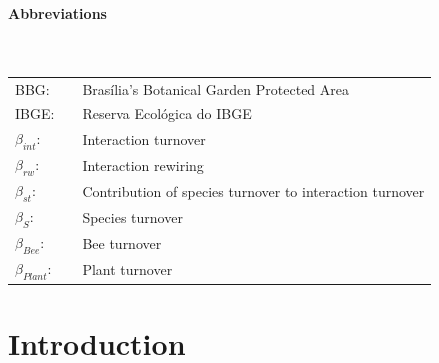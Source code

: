 \documentclass[11pt]{article}
\begin{document}
\newpage
{}
\vspace*{\fill}
\tableofcontents 
\vspace*{\fill} 
\thispagestyle{empty}

\doublespacing

\newpage 
\vspace*{\fill}
{\huge\bfseries Abbreviations} \\
\\
\\
\begin{table}[h]
\centering
\large
{}
\label{my-label}
\begin{tabular}{lll}
BBG:            &  & Bras\'ilia's Botanical Garden Protected Area             \\
IBGE:           &  & Reserva Ecol\'ogica do IBGE                              \\
$\beta_{int}$:   &  & Interaction turnover                                     \\
$\beta_{rw}$:    &  & Interaction rewiring                                     \\
$\beta_{st}$:    &  & Contribution of species turnover to interaction turnover \\
$\beta_{S}$:     &  & Species turnover                                         \\
$\beta_{Bee}$:   &  & Bee turnover                                             \\
$\beta_{Plant}$: &  & Plant turnover                                          
\end{tabular}
\end{table}
\vfill

\newpage
\pagestyle{fancy}
\fancyhf{}
\renewcommand{\headrulewidth}{0pt}

\section{Introduction} %
\end{document}
